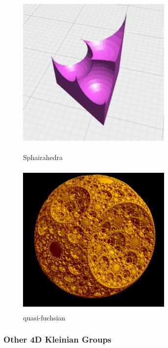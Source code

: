 \begin{figure}[htbp]
 \begin{minipage}{0.49\hsize}
  \begin{center}
   \includegraphics[width=3in, height=3in, keepaspectratio]{../img/klein/sphairahedra.pdf}
   \caption{Sphairahedra}
   \label{fig:sphairahedra}
  \end{center}
 \end{minipage}
 \begin{minipage}{0.49\hsize}
  \begin{center}
   \includegraphics[width=3in, height=3in, keepaspectratio]{../img/klein/quasi-fuchsian.pdf}
   \caption{quasi-fuchsian}
   \label{fig:quasiFuchsian}
  \end{center}
 \end{minipage}
\end{figure}

\subsubsection{Other 4D Kleinian Groups}

